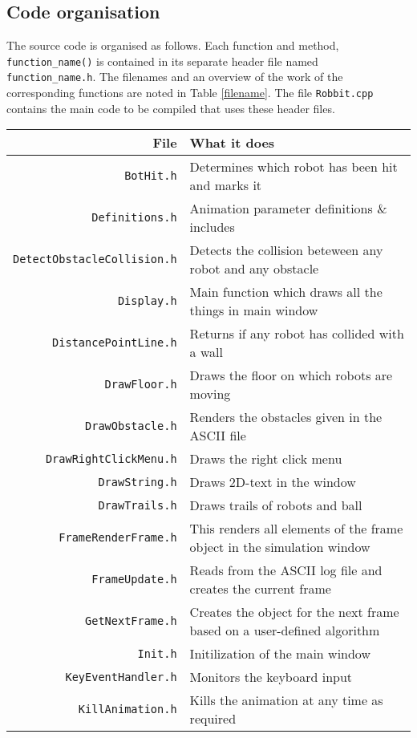 \documentclass[10pt,a4paper]{article}
\begin{document}
\subsection{Code organisation}
The source code is organised as follows. Each function and method, \texttt{function\_name()} is contained in its separate header file named \texttt{function\_name.h}. The filenames and an overview of the work of the corresponding functions are noted in Table \ref{filename}. The file \texttt{Robbit.cpp} contains the main code to be compiled that uses these header files.

\begin{table}[ht]
\centering
\begin{tabular}{| r | l |}
\hline
File								& What it does \\
\hline
\texttt{BotHit.h}					& Determines which robot has been hit and marks it \\
\texttt{Definitions.h}				& Animation parameter definitions \& includes \\
\texttt{DetectObstacleCollision.h}	& Detects the collision beteween any robot and any obstacle \\
\texttt{Display.h}					& Main function which draws all the things in main window \\
\texttt{DistancePointLine.h}		& Returns if any robot has collided with a wall \\
\texttt{DrawFloor.h}				& Draws the floor on which robots are moving \\
\texttt{DrawObstacle.h}				& Renders the obstacles given in the ASCII file \\
\texttt{DrawRightClickMenu.h}		& Draws the right click menu  \\
\texttt{DrawString.h}				& Draws 2D-text in the window \\
\texttt{DrawTrails.h}				& Draws trails of robots and ball \\
\texttt{FrameRenderFrame.h}			& This renders all elements of the frame object in the simulation window \\
\texttt{FrameUpdate.h}				& Reads from the ASCII log file and creates the current frame \\
\texttt{GetNextFrame.h}				& Creates the object for the next frame based on a user-defined algorithm \\
\texttt{Init.h}						& Initilization of the main window \\
\texttt{KeyEventHandler.h}			& Monitors the keyboard input \\
\texttt{KillAnimation.h}			& Kills the animation at any time as required \\

\end{tabular}
\end{table}
\end{document}

